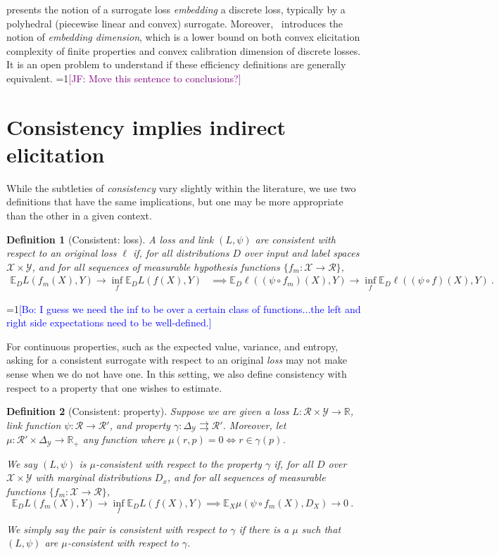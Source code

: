 \documentclass{article}
\newcommand{\Comments}{1}
\newcommand{\mynote}[2]{\ifnum\Comments=1\textcolor{#1}{#2}\fi}
\newcommand{\jessie}[1]{\mynote{purple}{[JF: #1]}}
\newcommand{\bo}[1]{\mynote{blue}{[Bo: #1]}}
\newcommand{\reals}{\mathbb{R}}
\newcommand{\simplex}{\Delta_\Y}
\newcommand{\propdis}{\mu}
\newcommand{\E}{\mathbb{E}}
\newcommand{\R}{\mathcal{R}}
\newcommand{\X}{\mathcal{X}}
\newcommand{\Y}{\mathcal{Y}}
\newcommand{\toto}{\rightrightarrows}
\newtheorem{definition}{Definition}
\begin{document}
\cite{finocchiaro2019embedding} presents the notion of a surrogate loss \emph{embedding} a discrete loss, typically by a polyhedral (piecewise linear and convex) surrogate.
Moreover,~\cite{finocchiaro2020embedding} introduces the notion of \emph{embedding dimension}, which is a lower bound on both convex elicitation complexity of finite properties and convex calibration dimension of discrete losses.
It is an open problem to understand if these efficiency definitions are generally equivalent. \jessie{Move this sentence to conclusions?}


\section{Consistency implies indirect elicitation}\label{sec:consis-implies-indir}
While the subtleties of \emph{consistency} vary slightly within the literature, we use two definitions that have the same implications, but one may be more appropriate than the other in a given context.

\begin{definition}[Consistent: loss]\label{def:consistent-ell}
	A loss and link $(L,\psi)$ are consistent with respect to an original loss $\ell$ if, for all distributions $D$ over input and label spaces $\X \times\Y$, and for all sequences of measurable hypothesis functions $\{f_m : \X \to \R\}$,
	\begin{align*}
	\E_D L(f_m(X), Y) \to \inf_f \E_D L(f(X), Y) &\implies \E_D \ell((\psi \circ f_m)(X), Y) \to \inf_f \E_D \ell((\psi \circ f)(X), Y)~.~
	\end{align*}
\end{definition}
\bo{I guess we need the inf to be over a certain class of functions...the left and right side expectations need to be well-defined.}

For continuous properties, such as the expected value, variance, and entropy, asking for a consistent surrogate with respect to an original \emph{loss} may not make sense when we do not have one.
In this setting, we also define consistency with respect to a property that one wishes to estimate. 

\begin{definition}[Consistent: property]\label{def:consistent-prop}
	Suppose we are given a loss $L : \R \times \Y \to \reals$, link function $\psi: \R \to \R'$, and property $\gamma:\simplex \toto \R'$.
	Moreover, let $\propdis : \R' \times \simplex \to \reals_+$ any function where $\propdis(r,p) = 0 \iff r \in \gamma(p)$.
	
	We say $(L, \psi)$ is \emph{$\mu$-consistent with respect to the property} $\gamma$ if, for all $D$ over $\X \times \Y$ with marginal distributions $D_x$, and for all sequences of measurable functions $\{f_m: \X \to \R\}$, 
	\begin{equation}
	\E_{D} L(f_m(X), Y) \to \inf_f \E_{D} L( f(X), Y) \implies \E_X \propdis(\psi \circ f_m(X), D_X) \to 0~.~
	\end{equation}
	
	We simply say the pair is consistent with respect to $\gamma$ if there is a $\propdis$ such that $(L,\psi)$ are $\propdis$-consistent with respect to $\gamma$.
\end{definition}
\end{document}
